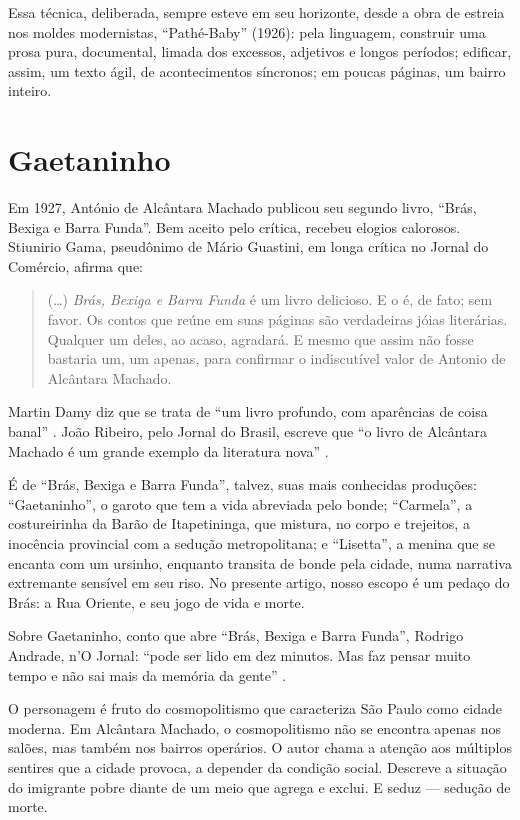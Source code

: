 \begin{refsection}
    Essa técnica, deliberada, sempre esteve em seu horizonte, desde a obra de estreia nos moldes modernistas, ``Pathé-Baby'' (1926): pela linguagem, construir uma prosa pura, documental, limada dos excessos, adjetivos e longos períodos; edificar, assim, um texto ágil, de acontecimentos síncronos; em poucas páginas, um bairro inteiro.

    \section{Gaetaninho}

    Em 1927, António de Alcântara Machado publicou seu segundo livro, ``Brás, Bexiga e Barra Funda''. Bem aceito pelo crítica, recebeu elogios calorosos. Stiunirio Gama, pseudônimo de Mário Guastini, em longa crítica no Jornal do Comércio, afirma que: 

    \begin{quotation}
        (\dots) \textit{Brás, Bexiga e Barra Funda} é um livro delicioso. E o é, de fato; sem favor. Os contos que reúne em suas páginas são verdadeiras jóias literárias. Qualquer um deles, ao acaso, agradará. E mesmo que assim não fosse bastaria um, um apenas, para confirmar o indiscutível valor de Antonio de Alcântara Machado. \cite[p.~92]{Gama1984Segundas}
    \end{quotation}


    Martin Damy diz que se trata de ``um livro profundo, com aparências de coisa banal'' \cite[p.~101]{Damy1984Espirito}. João Ribeiro, pelo Jornal do Brasil, escreve que ``o livro de Alcântara Machado é um grande exemplo da literatura nova'' \cite[p.~102]{Ribeiro1982Bras}.  

    É de ``Brás, Bexiga e Barra Funda'', talvez, suas mais conhecidas produções: ``Gaetaninho'', o garoto que tem a vida abreviada pelo bonde; ``Carmela'', a costureirinha da Barão de Itapetininga, que mistura, no corpo e trejeitos, a inocência provincial com a sedução metropolitana; e ``Lisetta'', a menina que se encanta com um ursinho, enquanto transita de bonde pela cidade, numa narrativa extremante sensível em seu riso. No presente artigo, nosso escopo é um pedaço do Brás: a Rua Oriente, e seu jogo de vida e morte.   

    Sobre Gaetaninho, conto que abre ``Brás, Bexiga e Barra Funda'', Rodrigo Andrade, n'O Jornal: ``pode ser lido em dez minutos. Mas faz pensar muito tempo e não sai mais da memória da gente'' \cite[p.~95]{Andrade1982Vida}.  

    O personagem é fruto do cosmopolitismo que caracteriza São Paulo como cidade moderna. Em Alcântara Machado, o cosmopolitismo não se encontra apenas nos salões, mas também nos bairros operários. O autor chama a atenção aos múltiplos sentires que a cidade provoca, a depender da condição social. Descreve a situação do imigrante pobre diante de um meio que agrega e exclui. E seduz --- sedução de morte.  


\end{refsection}
